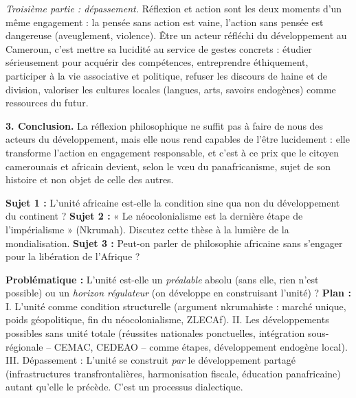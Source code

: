 \documentclass[11pt]{article}
\begin{document}
\begin{exoresolu}
\emph{Troisième partie : dépassement.} Réflexion et action sont les deux moments d'un même engagement : la pensée sans action est vaine, l'action sans pensée est dangereuse (aveuglement, violence). Être un acteur réfléchi du développement au Cameroun, c'est mettre sa lucidité au service de gestes concrets : étudier sérieusement pour acquérir des compétences, entreprendre éthiquement, participer à la vie associative et politique, refuser les discours de haine et de division, valoriser les cultures locales (langues, arts, savoirs endogènes) comme ressources du futur.

\textbf{3. Conclusion.} La réflexion philosophique ne suffit pas à faire de nous des acteurs du développement, mais elle nous rend capables de l'être lucidement : elle transforme l'action en engagement responsable, et c'est à ce prix que le citoyen camerounais et africain devient, selon le vœu du panafricanisme, sujet de son histoire et non objet de celle des autres.
\end{exoresolu}

\begin{exercice}
\textbf{Sujet 1 :} L'unité africaine est-elle la condition sine qua non du développement du continent ?
\textbf{Sujet 2 :} « Le néocolonialisme est la dernière étape de l'impérialisme » (Nkrumah). Discutez cette thèse à la lumière de la mondialisation.
\textbf{Sujet 3 :} Peut-on parler de philosophie africaine sans s'engager pour la libération de l'Afrique ?
\end{exercice}

\begin{corrige}
\textbf{Problématique :} L'unité est-elle un \emph{préalable} absolu (sans elle, rien n'est possible) ou un \emph{horizon régulateur} (on développe en construisant l'unité) ?
\textbf{Plan :}
I. L'unité comme condition structurelle (argument nkrumahiste : marché unique, poids géopolitique, fin du néocolonialisme, ZLECAf).
II. Les développements possibles sans unité totale (réussites nationales ponctuelles, intégration sous-régionale -- CEMAC, CEDEAO -- comme étapes, développement endogène local).
III. Dépassement : L'unité se construit \emph{par} le développement partagé (infrastructures transfrontalières, harmonisation fiscale, éducation panafricaine) autant qu'elle le précède. C'est un processus dialectique.
\end{corrige}
\end{document}
